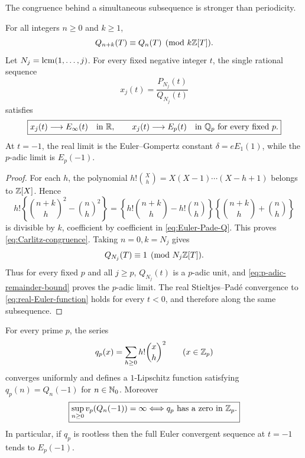 The congruence behind a simultaneous subsequence is stronger than periodicity.

\begin{theorem}
\label{thm:common-placewise-subsequence}
For all integers \(n\ge0\) and \(k\ge1\),
\begin{equation}\label{eq:Carlitz-congruence}
 Q_{n+k}(T)\equiv Q_n(T)\pmod{k\mathbb Z[T]}.
\end{equation}
Let \(N_j=\operatorname{lcm}(1,\ldots,j)\).  For every fixed negative integer \(t\), the
single rational sequence
\begin{equation}\label{eq:common-rational-sequence}
 x_j(t)=\frac{P_{N_j}(t)}{Q_{N_j}(t)}
\end{equation}
satisfies
\begin{equation}\label{eq:common-placewise-limits}
 \boxed{\displaystyle
 x_j(t)\longrightarrow E_\infty(t)\quad\text{in }\mathbb R,
 \qquad
 x_j(t)\longrightarrow E_p(t)\quad\text{in }\mathbb Q_p
 \text{ for every fixed }p.}
\end{equation}
At \(t=-1\), the real limit is the Euler--Gompertz constant
\(\delta=eE_1(1)\), while the \(p\)-adic limit is \(E_p(-1)\).
\end{theorem}

\begin{proof}
For each \(h\), the polynomial
\(h!\binom Xh=X(X-1)\cdots(X-h+1)\) belongs to \(\mathbb Z[X]\).  Hence
\[
 h!\left\{\binom{n+k}h^2-\binom nh^2\right\}
 =\left\{h!\binom{n+k}h-h!\binom nh\right\}
  \left\{\binom{n+k}h+\binom nh\right\}
\]
is divisible by \(k\), coefficient by coefficient in
\eqref{eq:Euler-Pade-Q}.  This proves \eqref{eq:Carlitz-congruence}.
Taking \(n=0,k=N_j\) gives
\begin{equation}\label{eq:QN-unit-all-p}
 Q_{N_j}(T)\equiv1\pmod{N_j\mathbb Z[T]}.
\end{equation}
Thus for every fixed \(p\) and all \(j\ge p\), \(Q_{N_j}(t)\) is a
\(p\)-adic unit, and \eqref{eq:p-adic-remainder-bound} proves the \(p\)-adic
limit.  The real Stieltjes--Pad\'e convergence to
\eqref{eq:real-Euler-function} holds for every \(t<0\), and therefore along
the same subsequence.
\end{proof}

\begin{proposition}
\label{prop:p-adic-denominator-interpolation}
For every prime \(p\), the series
\begin{equation}\label{eq:q-p-interpolation}
 q_p(x)=\sum_{h\ge0}h!\binom xh^2\qquad(x\in\mathbb Z_p)
\end{equation}
converges uniformly and defines a \(1\)-Lipschitz function satisfying
\(q_p(n)=Q_n(-1)\) for \(n\in\mathbb N_0\).  Moreover
\begin{equation}\label{eq:q-p-root-criterion}
 \boxed{\displaystyle
 \sup_{n\ge0}v_p(Q_n(-1))=\infty
 \Longleftrightarrow q_p\text{ has a zero in }\mathbb Z_p.}
\end{equation}
In particular, if \(q_p\) is rootless then the full Euler convergent
sequence at \(t=-1\) tends to \(E_p(-1)\).
\end{proposition}

